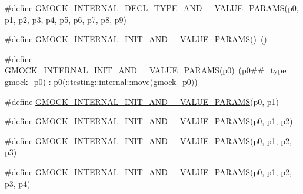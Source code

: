 \begin{DoxyCompactItemize}
\item 
\#define \mbox{\hyperlink{_obj__test_2lib_2googletest-release-1_88_81_2googlemock_2include_2gmock_2gmock-generated-actions_8h_a791e16a318652e43abb3c1aeba969d4d}{G\+M\+O\+C\+K\+\_\+\+I\+N\+T\+E\+R\+N\+A\+L\+\_\+\+D\+E\+C\+L\+\_\+\+T\+Y\+P\+E\+\_\+\+A\+N\+D\+\_\+\_\+\+V\+A\+L\+U\+E\+\_\+\+P\+A\+R\+A\+MS}}(p0,  p1,  p2,  p3,  p4,  p5,  p6,  p7,  p8,  p9)
\item 
\#define \mbox{\hyperlink{_obj__test_2lib_2googletest-release-1_88_81_2googlemock_2include_2gmock_2gmock-generated-actions_8h_aea5ee581daf40874ee7777e3c2b6d4ff}{G\+M\+O\+C\+K\+\_\+\+I\+N\+T\+E\+R\+N\+A\+L\+\_\+\+I\+N\+I\+T\+\_\+\+A\+N\+D\+\_\+\_\+\+V\+A\+L\+U\+E\+\_\+\+P\+A\+R\+A\+MS}}()~()
\item 
\#define \mbox{\hyperlink{_obj__test_2lib_2googletest-release-1_88_81_2googlemock_2include_2gmock_2gmock-generated-actions_8h_ad9d6ae16782bf5b8ffa096356f20b5ef}{G\+M\+O\+C\+K\+\_\+\+I\+N\+T\+E\+R\+N\+A\+L\+\_\+\+I\+N\+I\+T\+\_\+\+A\+N\+D\+\_\+\_\+\+V\+A\+L\+U\+E\+\_\+\+P\+A\+R\+A\+MS}}(p0)~(p0\#\#\+\_\+type gmock\+\_\+p0) \+: p0(\+::\mbox{\hyperlink{namespacetesting_1_1internal_a0f6d06bf8c3093b9c22bb08723db201e}{testing\+::internal\+::move}}(gmock\+\_\+p0))
\item 
\#define \mbox{\hyperlink{_obj__test_2lib_2googletest-release-1_88_81_2googlemock_2include_2gmock_2gmock-generated-actions_8h_af8fc781d28282b09de4b5bda9563cded}{G\+M\+O\+C\+K\+\_\+\+I\+N\+T\+E\+R\+N\+A\+L\+\_\+\+I\+N\+I\+T\+\_\+\+A\+N\+D\+\_\+\_\+\+V\+A\+L\+U\+E\+\_\+\+P\+A\+R\+A\+MS}}(p0,  p1)
\item 
\#define \mbox{\hyperlink{_obj__test_2lib_2googletest-release-1_88_81_2googlemock_2include_2gmock_2gmock-generated-actions_8h_ab452cc97981b64f68df83aedc023a201}{G\+M\+O\+C\+K\+\_\+\+I\+N\+T\+E\+R\+N\+A\+L\+\_\+\+I\+N\+I\+T\+\_\+\+A\+N\+D\+\_\+\_\+\+V\+A\+L\+U\+E\+\_\+\+P\+A\+R\+A\+MS}}(p0,  p1,  p2)
\item 
\#define \mbox{\hyperlink{_obj__test_2lib_2googletest-release-1_88_81_2googlemock_2include_2gmock_2gmock-generated-actions_8h_a9749c8366b3617ee3d14f4f4e9ae18ae}{G\+M\+O\+C\+K\+\_\+\+I\+N\+T\+E\+R\+N\+A\+L\+\_\+\+I\+N\+I\+T\+\_\+\+A\+N\+D\+\_\+\_\+\+V\+A\+L\+U\+E\+\_\+\+P\+A\+R\+A\+MS}}(p0,  p1,  p2,  p3)
\item 
\#define \mbox{\hyperlink{_obj__test_2lib_2googletest-release-1_88_81_2googlemock_2include_2gmock_2gmock-generated-actions_8h_ab3c77cabbb94ae2e3a4f9fdbda784731}{G\+M\+O\+C\+K\+\_\+\+I\+N\+T\+E\+R\+N\+A\+L\+\_\+\+I\+N\+I\+T\+\_\+\+A\+N\+D\+\_\+\_\+\+V\+A\+L\+U\+E\+\_\+\+P\+A\+R\+A\+MS}}(p0,  p1,  p2,  p3,  p4)

\end{DoxyCompactItemize}
